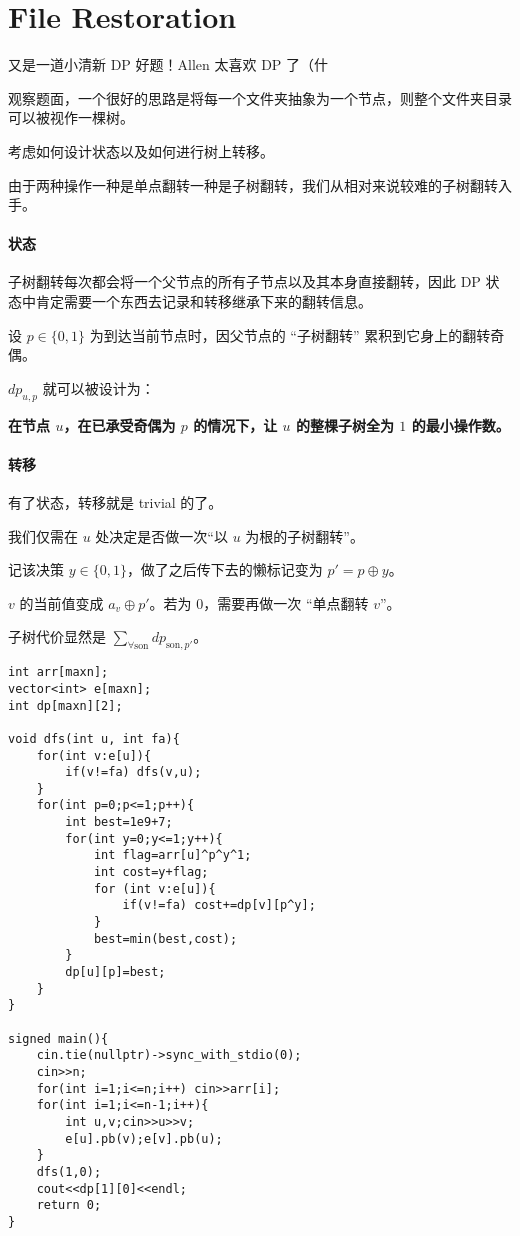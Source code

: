 \documentclass[14pt,a4paper]{article}
\begin{document}
\section{File Restoration}
又是一道小清新 DP 好题！Allen 太喜欢 DP 了（什

观察题面，一个很好的思路是将每一个文件夹抽象为一个节点，则整个文件夹目录可以被视作一棵树。

考虑如何设计状态以及如何进行树上转移。

由于两种操作一种是单点翻转一种是子树翻转，我们从相对来说较难的子树翻转入手。

\paragraph{状态}
子树翻转每次都会将一个父节点的所有子节点以及其本身直接翻转，因此 DP 状态中肯定需要一个东西去记录和转移继承下来的翻转信息。

设 $p\in\{0,1\}$ 为到达当前节点时，因父节点的 “子树翻转” 累积到它身上的翻转奇偶。

$dp_{u,p}$ 就可以被设计为：

\textbf{在节点 $u$，在已承受奇偶为 $p$ 的情况下，让 $u$ 的整棵子树全为 $1$ 的最小操作数。}

\paragraph{转移}
有了状态，转移就是 trivial 的了。

我们仅需在 $u$ 处决定是否做一次“以 $u$ 为根的子树翻转”。

记该决策 $y\in\{0,1\}$，做了之后传下去的懒标记变为 $p' = p\oplus y$。

$v$ 的当前值变成 $a_v\oplus p'$。若为 $0$，需要再做一次 “单点翻转 $v$”。

子树代价显然是 $\sum_{\forall \text{son}} dp_{\text{son},p'}$。

\begin{verbatim}
int arr[maxn];
vector<int> e[maxn];
int dp[maxn][2];

void dfs(int u, int fa){
    for(int v:e[u]){
        if(v!=fa) dfs(v,u);
    }
    for(int p=0;p<=1;p++){
        int best=1e9+7;
        for(int y=0;y<=1;y++){
            int flag=arr[u]^p^y^1;
            int cost=y+flag;
            for (int v:e[u]){
                if(v!=fa) cost+=dp[v][p^y];
            }
            best=min(best,cost);
        }
        dp[u][p]=best;
    }
}

signed main(){
    cin.tie(nullptr)->sync_with_stdio(0);
    cin>>n;
    for(int i=1;i<=n;i++) cin>>arr[i];
    for(int i=1;i<=n-1;i++){
        int u,v;cin>>u>>v;
        e[u].pb(v);e[v].pb(u);
    }
    dfs(1,0);
    cout<<dp[1][0]<<endl;
    return 0;
}
\end{verbatim}
\end{document}
